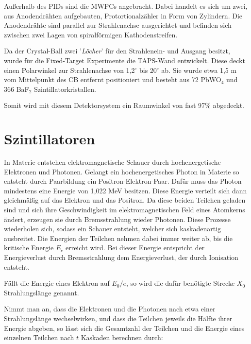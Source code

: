 \documentclass[a4paper,11pt,oneside,final,german,openbib,pdftex]{scrbook}
\begin{document}
{Au{\ss}erhalb des PIDs sind die MWPCs angebracht. Dabei handelt es sich um zwei, aus Anodendr\"ahten aufgebauten, Protortionalz\"ahler in Form von Zylindern. Die Anodendr\"ahte sind parallel zur Strahlenachse ausgerichtet und befinden sich zwischen zwei Lagen von spiralf\"ormigen Kathodenstreifen. 

Da der Crystal-Ball zwei '\textit{L\"ocher}' f\"ur den Strahlenein- und Ausgang besitzt, wurde f\"ur die Fixed-Target Experimente die TAPS-Wand entwickelt.
Diese deckt einen Polarwinkel zur Strahlenachse von 1,2$^{\circ}$ bis 20$^{\circ}$ ab. Sie wurde etwa 1,5 m vom Mittelpunkt des CB entfernt positioniert und besteht aus 72 PbWO$_4$ und 366 BaF$_2$ Szintillatorkristallen. 

Somit wird mit diesem Detektorsystem ein Raumwinkel von fast 97\% abgedeckt.

\section{Szintillatoren}
\label{fig:Szintillatoren}

In Materie entstehen elektromagnetische Schauer durch hochenergetische Elektronen und Photonen. \cite{Leo87}
Gelangt ein hochenergetisches Photon in Materie so entsteht durch Paarbildung ein Positron-Elektron-Paar. Dafür muss das Photon mindestens eine Energie von 1,022 MeV besitzen. Diese Energie verteilt sich dann gleichmäßig auf das Elektron und das Positron. Da diese beiden Teilchen geladen sind und sich ihre Geschwindigkeit im elektromagnetischen Feld eines Atomkerns ändert, erzeugen sie durch Bremsstrahlung wieder Photonen. Diese Prozesse wiederholen sich, sodass ein Schauer entsteht, welcher sich kaskadenartig ausbreitet. Die Energien der Teilchen nehmen dabei immer weiter ab, bis die kritische Energie $E_c$ erreicht wird. Bei dieser Energie entspricht der Energieverlust durch Bremsstrahlung dem Energieverlust, der durch Ionisation entsteht.

Fällt die Energie eines Elektron auf $E_0/e$, so wird die dafür benötigte Strecke $X_0$ Strahlungslänge genannt.
\newline

Nimmt man an, dass die Elektronen und die Photonen nach etwa einer Strahlungslänge wechselwirken, und dass die Teilchen jeweils die Hälfte ihrer Energie abgeben, so lässt sich die Gesamtzahl der Teilchen und die Energie eines einzelnen Teilchen nach $t$ Kaskaden berechnen durch\cite{Leo87}:

}
\end{document}
